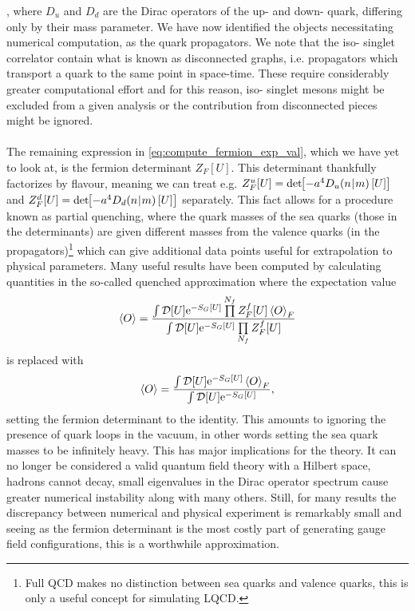 \documentclass[a4paper,10pt]{book}
\begin{document}
\cite{Gattringer:2010zz}, where $D_u$ and $D_d$ are the Dirac operators of the up- and down- quark, differing only by their mass parameter. We have now identified the objects necessitating numerical computation, as the quark propagators. We note that the iso- singlet correlator contain what is known as disconnected graphs, i.e. propagators which transport a quark to the same point in space-time. These require considerably greater computational effort and for this reason, iso- singlet mesons might be excluded from a given analysis or the contribution from disconnected pieces might be ignored.\\\\The remaining expression in \eqref{eq:compute_fermion_exp_val}, which we have yet to look at, is the fermion determinant $Z_{F}[U]$. This determinant thankfully factorizes by flavour, meaning we can treat e.g. $Z_{F}^u[U] = \operatorname{det}\mkern-5mu\left[ -a^4D_u(n\mkern-4mu\mid \mkern-4mu m)\left[ U \right] \right]$ and $Z_{F}^d[U]=\operatorname{det}\mkern-5mu\left[ -a^4D_d(n\mkern-4mu\mid \mkern-4mu m)\left[ U \right] \right]$ separately. This fact allows for a procedure known as partial quenching, where the quark masses of the sea quarks (those in the determinants) are given different masses from the valence quarks (in the propagators)\footnote{Full QCD makes no distinction between sea quarks and valence quarks, this is only a useful concept for simulating LQCD.} which can give additional data points useful for extrapolation to physical parameters. Many useful results have been computed by calculating quantities in the so-called quenched approximation where the expectation value
\begin{equation}
\braket{O}=\frac{\int \mathcal{D}[U] \mathrm{e}^{-S_{G}[U]} \prod\limits^{N_f} Z_{F}^f[U] \braket{O}_{F}}{\int \mathcal{D}[U] \mathrm{e}^{-S_{G}[U]} \prod\limits_{N_f} Z_{F}^f[U]} 
\end{equation}
is replaced with
\begin{equation}
\braket{O}=\frac{\int \mathcal{D}[U] \mathrm{e}^{-S_{G}[U]}  \braket{O}_{F}}{\int \mathcal{D}[U] \mathrm{e}^{-S_{G}[U]} },
\end{equation}
setting the fermion determinant to the identity. This amounts to ignoring the presence of quark loops in the vacuum, in other words setting the sea quark masses to be infinitely heavy. This has major implications for the theory. It can no longer be considered a valid quantum field theory with a Hilbert space, hadrons cannot decay, small eigenvalues in the Dirac operator spectrum cause greater numerical instability along with many others. Still, for many results the discrepancy between numerical and physical experiment is remarkably small \cite{aoki2003light} and seeing as the fermion determinant is the most costly part of generating gauge field configurations, this is a worthwhile approximation.
\end{document}
